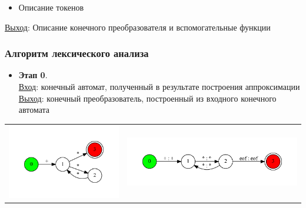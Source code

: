\documentclass{beamer}
\begin{document}
\begin{frame}[fragile]
\begin{itemize}
\item Описание токенов
\end{itemize}

\underline{Выход}: Описание конечного преобразователя и вспомогательные функции
\end{frame}

\begin{frame}[fragile]
\transwipe[direction=90]
\frametitle{Алгоритм лексического анализа}
\begin{itemize}
\item \textbf{Этап 0}. \\
\underline{Вход}: конечный автомат, полученный в результате построения аппроксимации \\
\underline{Выход}: конечный преобразователь, построенный из входного конечного автомата
\end{itemize}

\begin{tabular}{l r}
     \begin{minipage}{.35\textwidth} 
     \includegraphics[width=\linewidth]{calc_ex}
     \end{minipage}  
     & 
	\begin{minipage}{.55\textwidth}    
	 \includegraphics[width=\linewidth]{calc_ex_fst}
	\end{minipage} \\
\end{tabular} 
\end{frame}
\end{document}
